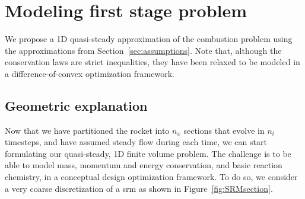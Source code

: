 \section{Modeling first stage problem}

We propose a 1D quasi-steady approximation of the combustion problem
using the approximations from Section~\ref{sec:assumptions}. Note
that, although the conservation laws are strict inequalities,
they have been relaxed to be modeled in a difference-of-convex
optimization framework.

\subsection{Geometric explanation}

Now that we have partitioned the rocket into $n_x$ sections that evolve in $n_t$ timesteps,
and have assumed steady flow during each time, we can start formulating our quasi-steady,
1D finite volume problem. The challenge is to be able to model mass, momentum and energy conservation,
and basic reaction chemistry, in a conceptual design optimization framework. To do so,
we consider a very coarse discretization of a \gls{srm} as shown in Figure~\ref{fig:SRMsection}.


